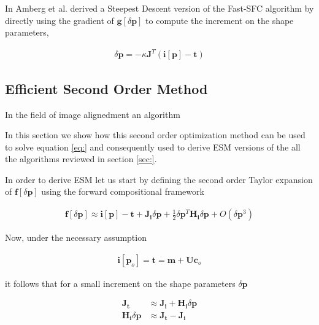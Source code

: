 In \cite{} Amberg et al. derived a Steepest Descent version of the Fast-SFC algorithm by directly using the gradient of $\mathbf{g}[\delta \mathbf{p}]$ to compute the increment on the shape parameters, 

\begin{equation}
	\begin{aligned}
		\delta \mathbf{p} = - \kappa \mathbf{J}^T \left( \mathbf{i}[\mathbf{p}] - \mathbf{t} \right)
	\end{aligned}
\end{equation}

\subsection{Efficient Second Order Method}

In the field of image alignedment an algorithm

In this section we show how this second order optimization method can be used to solve equation \ref{eq:} and consequently used to derive ESM versions of the all the algorithms reviewed in section \ref{sec:}.

In order to derive ESM let us start by defining the second order Taylor expansion of $\mathbf{f}[\delta \mathbf{p}]$ using the forward compositional framework

\begin{equation}
	\begin{aligned}
		\mathbf{f}[\delta \mathbf{p}] \approx \mathbf{i}[\mathbf{p}] - \mathbf{t} + 
		\mathbf{J}_{\mathbf{i}} \delta \mathbf{p} + 
		\frac{1}{2} \delta \mathbf{p}^T \mathbf{H}_{\mathbf{i}} \delta \mathbf{p} + 
		O(\delta \mathbf{p}^3)
	\end{aligned}
\end{equation}

Now, under the necessary assumption

\begin{equation}
	\begin{aligned}
		\mathbf{i}[\mathbf{p}_o] = \mathbf{t} = \mathbf{m} + \mathbf{U} \mathbf{c}_o
	\end{aligned}
\end{equation}

it follows that for a small increment on the shape parameters $\delta \mathbf{p}$

\begin{equation}
	\begin{aligned}
		\mathbf{J}_\mathbf{t} & \approx \mathbf{J}_\mathbf{i} + \mathbf{H}_\mathbf{i} \delta \mathbf{p}
		\\
		\mathbf{H}_\mathbf{i} \delta \mathbf{p} & \approx \mathbf{J}_\mathbf{t} - \mathbf{J}_\mathbf{i} 
	\end{aligned}
\end{equation}

